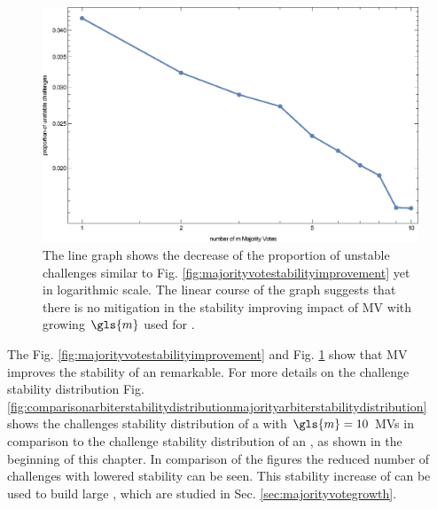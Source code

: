 \begin{figure}[ht]
\includegraphics[width=1.00\textwidth]{images/single-votes-stab-simulation_loglog.eps}
\caption[Decrease of unstable challenges of a \mpuf logarithmic]{The line graph shows the decrease of the proportion of unstable challenges similar to Fig. \ref{fig:majorityvotestabilityimprovement} yet in logarithmic scale. The  linear course of the graph suggests that there is no mitigation in the stability improving impact of \ac{MV} with growing $\gls{m}$ used for \mpufs.} 
\label{fig:majorityvotestabilityimprovementloglog}
\end{figure}

The Fig. \ref{fig:majorityvotestabilityimprovement} and Fig. \ref{fig:majorityvotestabilityimprovementloglog} show that \ac{MV} improves the stability of an \apuf remarkable. 
For more details on the challenge stability distribution Fig. \ref{fig:comparisonarbiterstabilitydistributionmajorityarbiterstabilitydistribution} shows the challenges stability distribution of a \mpuf with $\gls{m} = 10$ \acp{MV} in comparison to the challenge stability distribution of an \apuf, as shown in the beginning of this chapter.
In comparison of the figures the reduced number of challenges with lowered stability can be seen.
This stability increase of \mpufs can be used to build large \mxpufs, which are studied in Sec. \ref{sec:majorityvotegrowth}.


